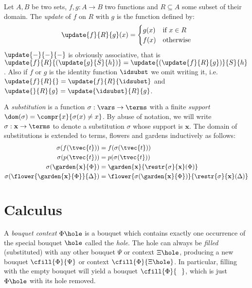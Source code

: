 \begin{definition}
  Let $A, B$ be two sets, $f, g : A \to B$ two functions and $R \subseteq A$
  some subset of their domain. The \emph{update} of $f$ on $R$ with $g$ is the
  function defined by:
  $$
  \update{f}{R}{g}(x) =
  \begin{cases}
    g(x) &\text{if $x \in R$} \\
    f(x) &\text{otherwise}
  \end{cases}
  $$
  $\update{-}{-}{-}$ is obviously associative, that is
  $\update{f}{R}{(\update{g}{S}{h})} = \update{(\update{f}{R}{g})}{S}{h}$. Also
  if $f$ or $g$ is the identity function $\idsubst$ we omit writing it, i.e.
  $\update{f}{R}{} = \update{f}{R}{\idsubst}$ and $\update{}{R}{g} =
  \update{\idsubst}{R}{g}$.
\end{definition}

\begin{definition}[Substitution]
  A \emph{substitution} is a function $\sigma : \vars \to \terms$ with a finite
  \emph{support} $\dom(\sigma) = \compr{x}{\sigma(x) \not= x}$. By abuse of
  notation, we will write $\sigma : \mathbf{x} \to \terms$ to denote a
  substitution $\sigma$ whose support is $\mathbf{x}$.
  The domain of substitutions is extended to terms, flowers and gardens
  inductively as follows:
  \begin{align*}
    \sigma(f(\tvec{t})) &= f(\sigma(\tvec{t})) \\
    \sigma(p(\tvec{t})) &= p(\sigma(\tvec{t})) \\
    \sigma(\garden{\mathbf{x}}{\Phi}) &=
      \garden{\mathbf{x}}{\restr{\sigma}{\mathbf{x}}(\Phi)} \\
    \sigma(\flower{\garden{\mathbf{x}}{\Phi}}{\Delta}) &=
      \flower{\sigma(\garden{\mathbf{x}}{\Phi})}{\restr{\sigma}{\mathbf{x}}(\Delta)}
  \end{align*}
\end{definition}


\section{Calculus}


\begin{definition}
  A \emph{bouquet context} $\Phi\hole$ is a bouquet which contains exactly one
  occurrence of the special bouquet $\hole$ called the \emph{hole}. The hole can
  always be \emph{filled} (substituted) with any other bouquet $\Psi$ or context
  $\Xi\hole$, producing a new bouquet $\cfill{\Phi}{\Psi}$ or context
  $\cfill{\Phi}{\Xi\hole}$. In particular, filling with the empty bouquet will
  yield a bouquet $\cfill{\Phi}{\phantom{\Phi}}$, which is just $\Phi\hole$ with
  its hole removed.
\end{definition}

